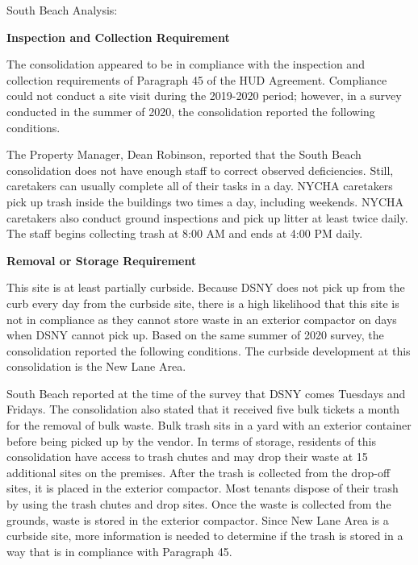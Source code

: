 South Beach Analysis: 

\textbf{Inspection and Collection Requirement} 

 

The consolidation appeared to be in compliance with the inspection and collection requirements of Paragraph 45 of the HUD Agreement. Compliance could not conduct a site visit during the 2019-2020 period; however, in a survey conducted in the summer of 2020, the consolidation reported the following conditions.

The Property Manager, Dean Robinson, reported that the South Beach consolidation does not have enough staff to correct observed deficiencies. Still, caretakers can usually complete all of their tasks in a day. NYCHA caretakers pick up trash inside the buildings two times a day, including weekends. NYCHA caretakers also conduct ground inspections and pick up litter at least twice daily. The staff begins collecting trash at 8:00 AM and ends at 4:00 PM daily.

\textbf{Removal or Storage Requirement}  

 

This site is at least partially curbside. Because DSNY does not pick up from the curb every day from the curbside site, there is a high likelihood that this site is not in compliance as they cannot store waste in an exterior compactor on days when DSNY cannot pick up.  Based on the same summer of  2020  survey, the consolidation reported the following conditions. The curbside development at this consolidation is the New Lane Area. 

 

South Beach reported at the time of the survey that DSNY comes Tuesdays and Fridays. The consolidation also stated that it received five bulk tickets a month for the removal of bulk waste.  Bulk trash sits in a yard with an exterior container before being picked up by the vendor. In terms of storage, residents of this consolidation have access to trash chutes and may drop their waste at 15 additional sites on the premises. After the trash is collected from the drop-off sites, it is placed in the exterior compactor. Most tenants dispose of their trash by using the trash chutes and drop sites. Once the waste is collected from the grounds, waste is stored in the exterior compactor. Since New Lane Area is a curbside site, more information is needed to determine if the trash is stored in a way that is in compliance with Paragraph 45.  

 

